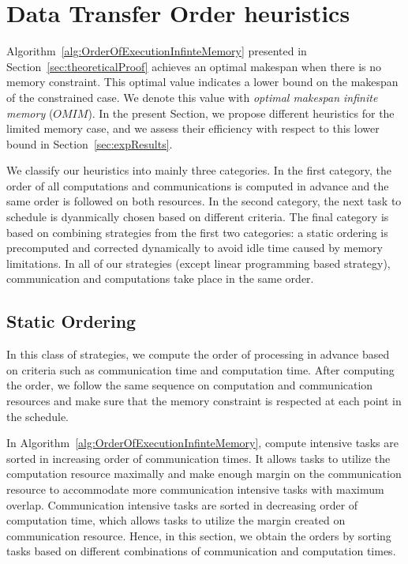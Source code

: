 \documentclass[sigconf]{acmart}
\begin{document}
	
	
	\section{Data Transfer Order heuristics}
	\label{sec:heuristics}
	
	Algorithm~\ref{alg:OrderOfExecutionInfinteMemory} presented in Section~\ref{sec:theoreticalProof} achieves an optimal makespan when there is no memory constraint. This optimal value indicates a lower bound on the makespan of the constrained case. We denote this value with \textit{optimal makespan infinite memory} ($OMIM$). In the present Section, we propose different heuristics for the limited memory case, and we assess their efficiency with respect to this lower bound in Section~\ref{sec:expResults}.
	
	
	We classify our heuristics into mainly three categories. In the first category, the order of all computations and communications is computed in advance and the same order is followed on both resources. In the second category, the next task to schedule is dyanmically chosen based on different criteria. The final category is based on combining strategies from the first two categories: a static ordering is precomputed and corrected dynamically to avoid idle time caused by memory limitations. In all of our strategies (except linear programming based strategy), communication and computations take place in the same order.
	
	\subsection{Static Ordering}
	In this class of strategies, we compute the order of processing in advance based on criteria such as communication time and computation time. After computing the order, we follow the same sequence on computation and communication resources and make sure that the memory constraint is respected at each point in the schedule.
	
	In Algorithm~\ref{alg:OrderOfExecutionInfinteMemory}, compute intensive tasks are sorted in increasing order of communication times. It allows tasks to utilize the computation resource maximally and make enough margin on the communication resource to accommodate more communication intensive tasks with maximum overlap. Communication intensive tasks are sorted in decreasing order of computation time, which allows tasks to utilize the margin created on communication resource. Hence, in this section, we obtain the orders by sorting tasks based on different combinations of communication and computation times.
	
\end{document}
